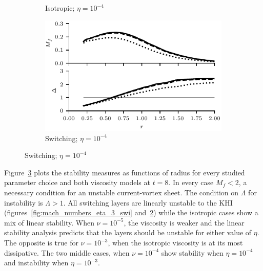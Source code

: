 \begin{figure}[t]
\begin{subfigure}{0.49\textwidth}
      \caption{Isotropic; $\eta = 10^{-4}$}%
      \label{fig:mach_numbers_eta_4_iso}
    \end{subfigure}
    \hfill
    \begin{subfigure}{0.49\textwidth}
      \centering
  \includegraphics[width=1.0\linewidth]{param_study/mach_numbers_eta_4_swi.pdf}
      \caption{Switching; $\eta = 10^{-4}$}%
      \label{fig:mach_numbers_eta_4_swi}
    \end{subfigure}
  \label{fig:mach_numbers}
\end{figure}

Figure~\ref{fig:mach_numbers} plots the stability measures as functions of radius for every studied parameter choice and both viscosity models at $t=8$. In every case $M_f < 2$, a necessary condition for an unstable current-vortex sheet. The condition on $\Lambda$ for instability is $\Lambda > 1$. All switching layers are linearly unstable to the KHI (figures~\ref{fig:mach_numbers_eta_3_swi} and~\ref{fig:mach_numbers_eta_4_swi}) while the isotropic cases show a mix of linear stability. When $\nu = 10^{-5}$, the viscosity is weaker and the linear stability analysis predicts that the layers should be unstable for either value of $\eta$. The opposite is true for $\nu=10^{-3}$, when the isotropic viscosity is at its most dissipative. The two middle cases, when $\nu=10^{-4}$ show stability when $\eta=10^{-4}$ and instability when $\eta=10^{-3}$.

